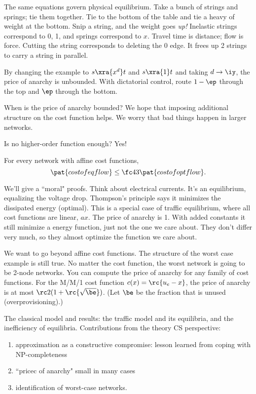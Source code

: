 The same equations govern physical equilibrium. Take a bunch of strings and springs; tie them together. Tie to the bottom of the table and tie a heavy of weight at the bottom. Snip a string, and the weight goes {\it up!} Inelastic strings correspond to 0, 1, and springs correspond to $x$. Travel time is distance; flow is force. Cutting the string corresponds to deleting the 0 edge. It frees up 2 strings to carry a string in parallel.


By changing the example to $s\xra{x^d}t$ and $s\xra{1}t$ and taking $d\to \iy$, the price of anarchy is unbounded. With dictatorial control, route $1-\ep$ through the top and $\ep$ through the bottom.

When is the price of anarchy bounded? We hope that imposing additional structure on the cost function helps. We worry that bad things happen in larger networks.

Is no higher-order function enough? Yes!
\begin{thm}
For every network with affine cost functions, 
\[
\pat{cost of eq flow}\le \fc43\pat{cost of opt flow}.
\]
\end{thm}
We'll give a ``moral" proofs. Think about electrical currents. It's an equilibrium, equalizing the voltage drop. Thompson's principle says it minimizes the dissipated energy (optimal). This is a special case of traffic equilibrium, where all cost functions are linear, $ax$. The price of anarchy is 1. With added constants it still minimize a energy function, just not the one we care about. They don't differ very much, so they almost optimize the function we care about.

We want to go beyond affine cost functions. The structure of the worst case example is still true. 
No matter the cost function, the worst network is going to be 2-node networks. You can compute the price of anarchy for any family of cost functions. For the M/M/1 cost function $c(x)=\rc{u_e-x}$, the price of anarchy is at most $\rc2(1+\rc{\sqrt \be})$. %
(Let $\be$ be the fraction that is unused (overprovisioning).)

The classical model and results: the traffic model and its equilibria, and the inefficiency of equilibria. 
Contributions from the theory CS perspective: 
\begin{enumerate}
\item
approximation as a constructive compromise: lesson learned from coping with NP-completeness
\item ``pricec of anarchy" small in many cases
\item identification of worst-case networks.
\end{enumerate}

